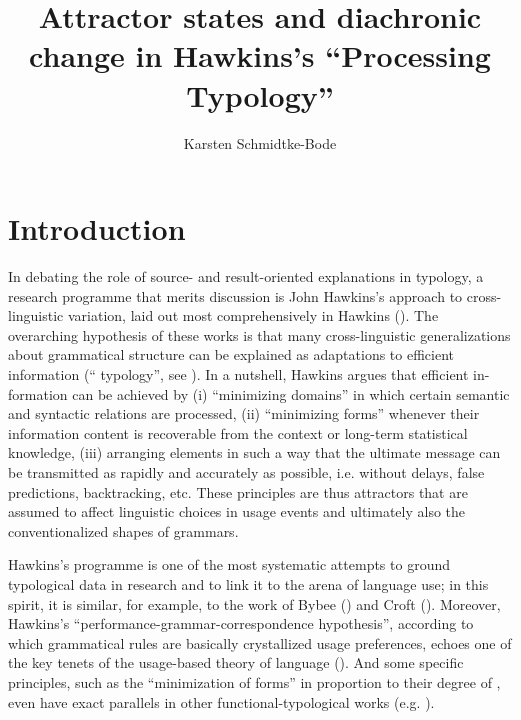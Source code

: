 \documentclass[output=paper]{langsci/langscibook}
\author{Karsten Schmidtke-Bode\affiliation{Leipzig University and Friedrich Schiller University Jena}}
\title{Attractor states and diachronic change in Hawkins’s “Processing Typology”}
\begin{document}
\maketitle 
 
\section{Introduction} 

In debating the role of source- and result-oriented explanations in typology, a research programme that merits discussion is John Hawkins’s approach to cross-linguistic variation, laid out most comprehensively in Hawkins (\citeyear{Hawkins1994_Perf,Hawkins2004_Eff,Hawkins2014_VarEff}). The overarching hypothesis of these works is that many cross-linguistic generalizations about grammatical structure can be explained as adaptations to efficient information  (“ typology”, see \citealt{Hawkins2007_Proc}). In a nutshell, Hawkins argues that efficient in-formation  can be achieved by (i) “minimizing domains” in which certain semantic and syntactic relations are processed, (ii) “minimizing forms” whenever their information content is recoverable from the context or long-term statistical knowledge, (iii) arranging elements in such a way that the ultimate message can be transmitted as rapidly and accurately as possible, i.e. without delays, false predictions, backtracking, etc. These  principles are thus attractors that are assumed to affect linguistic choices in usage events and ultimately also the conventionalized shapes of grammars.

Hawkins’s programme is one of the most systematic attempts to ground typological data in  research and to link it to the arena of language use; in this spirit, it is similar, for example, to the work of Bybee (\citeyear{Bybee1985_Morph,Bybee2010_Cogn}) and Croft (\citeyear{Croft2001_RadCon,Croft2003_Typ}). Moreover, Hawkins’s “performance-grammar-correspondence hypothesis”, according to which grammatical rules are basically crystallized usage preferences, echoes one of the key tenets of the usage-based theory of language (\citealt{Langacker1987_Found,Kemmer2000_Intro}). And some specific  principles, such as the “minimization of forms” in proportion to their degree of , even have exact parallels in other functional-typological works (e.g. \citealt{Haiman1983_Icon,Croft2003_Typ,Haspelmath2008_Econ}). 
\end{document}
